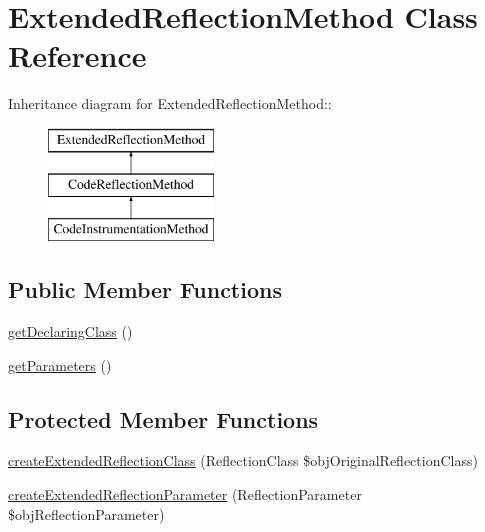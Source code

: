 \hypertarget{class_extended_reflection_method}{
\section{ExtendedReflectionMethod Class Reference}
\label{class_extended_reflection_method}
}
Inheritance diagram for ExtendedReflectionMethod::\begin{figure}[H]
\begin{center}
\leavevmode
\includegraphics[height=3cm]{class_extended_reflection_method}
\end{center}
\end{figure}
\subsection*{Public Member Functions}
\begin{CompactItemize}
\item 
\hyperlink{class_extended_reflection_method_8c818d6302b9518598ccb6138f14ccf5}{getDeclaringClass} ()
\item 
\hyperlink{class_extended_reflection_method_2644c74c4379a2aabde434aa5a7d4c64}{getParameters} ()
\end{CompactItemize}
\subsection*{Protected Member Functions}
\begin{CompactItemize}
\item 
\hyperlink{class_extended_reflection_method_e5727cf1a1b76d84e56a5fb312989ecb}{createExtendedReflectionClass} (ReflectionClass \$objOriginalReflectionClass)
\item 
\hyperlink{class_extended_reflection_method_a7d2760c2914c0ad6428171c4ca61503}{createExtendedReflectionParameter} (ReflectionParameter \$objReflectionParameter)
\end{CompactItemize}


